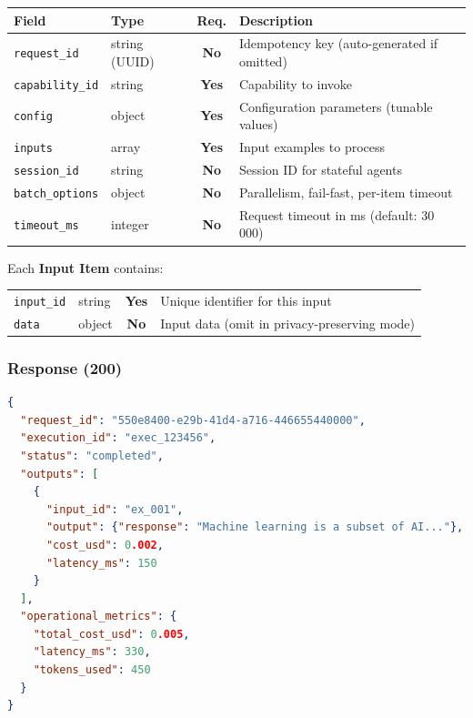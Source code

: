 \documentclass[11pt,a4paper]{article}
\newcommand{\field}[1]{\texttt{#1}}
\newcommand{\required}{\textbf{Yes}}
\newcommand{\optional}{\textbf{No}}
\begin{document}
\begin{center}\small
\begin{tabularx}{\textwidth}{@{}llcX@{}}
\toprule
\textbf{Field} & \textbf{Type} & \textbf{Req.} & \textbf{Description} \\
\midrule
\field{request\_id}    & string (UUID) & \optional & Idempotency key (auto-generated if omitted) \\
\field{capability\_id} & string        & \required & Capability to invoke \\
\field{config}         & object        & \required & Configuration parameters (tunable values) \\
\field{inputs}         & array         & \required & Input examples to process \\
\field{session\_id}    & string        & \optional & Session ID for stateful agents \\
\field{batch\_options} & object        & \optional & Parallelism, fail-fast, per-item timeout \\
\field{timeout\_ms}    & integer       & \optional & Request timeout in ms (default: 30\,000) \\
\bottomrule
\end{tabularx}
\end{center}

Each \textbf{Input Item} contains:

\begin{center}\small
\begin{tabularx}{\textwidth}{@{}llcX@{}}
\toprule
\field{input\_id} & string & \required & Unique identifier for this input \\
\field{data}      & object & \optional & Input data (omit in privacy-preserving mode) \\
\bottomrule
\end{tabularx}
\end{center}

\subsubsection{Response (200)}

\begin{lstlisting}[language=json]
{
  "request_id": "550e8400-e29b-41d4-a716-446655440000",
  "execution_id": "exec_123456",
  "status": "completed",
  "outputs": [
    {
      "input_id": "ex_001",
      "output": {"response": "Machine learning is a subset of AI..."},
      "cost_usd": 0.002,
      "latency_ms": 150
    }
  ],
  "operational_metrics": {
    "total_cost_usd": 0.005,
    "latency_ms": 330,
    "tokens_used": 450
  }
}
\end{lstlisting}
\end{document}
